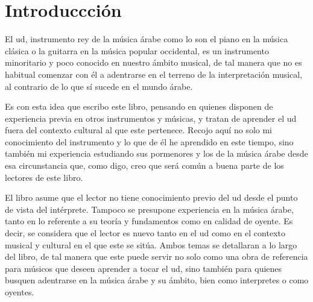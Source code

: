 \chapter*{Introduccción}

El ud, instrumento rey de la música árabe como lo son el piano en la música clásica o la guitarra en la música popular occidental, es un instrumento minoritario y poco conocido en nuestro ámbito musical, de tal manera que no es habitual comenzar con él a adentrarse en el terreno de la interpretación musical, al contrario de lo que sí sucede en el mundo árabe.

Es con esta idea que escribo este libro, pensando en quienes disponen de experiencia previa en otros instrumentos y músicas, y tratan de aprender el ud fuera del contexto cultural al que este pertenece. Recojo aquí no solo mi conocimiento del instrumento y lo que de él he aprendido en este tiempo, sino también mi experiencia estudiando sus pormenores y los de la música árabe desde esa circunstancia que, como digo, creo que será común a buena parte de los lectores de este libro.

El libro asume que el lector no tiene conocimiento previo del ud desde el punto de vista del intérprete. Tampoco se presupone experiencia en la música árabe, tanto en lo referente a su teoría y fundamentos como en calidad de oyente. Es decir, se considera que el lector es nuevo tanto en el ud como en el contexto musical y cultural en el que este se sitúa. Ambos temas se detallaran a lo largo del libro, de tal manera que este puede servir no solo como una obra de referencia para músicos que deseen aprender a tocar el ud, sino también para quienes busquen adentrarse en la música árabe y su ámbito, bien como interpretes o como oyentes.
